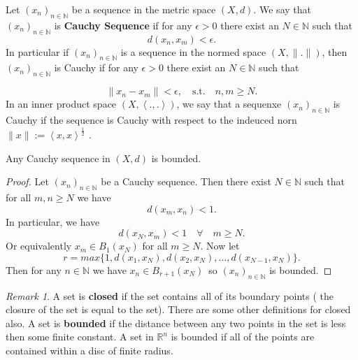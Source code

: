 \documentclass{article}
\theoremstyle{remark}
\newtheorem*{remark}{Remark}
\begin{document}
\begin{definition}
  
  Let $(x_n)_{n \in \mathbb{N}}$ be a sequence in the metric space $(X, d)$. We say that $\left( x_n \right)_{n \in \mathbb{N}} $ is \textbf{Cauchy Sequence} if for any $ \epsilon > 0$ there exist an $N \in \mathbb{N}$ such that \[  
    d(x_{n}, x_{m}) < \epsilon      
  .\]  
  In particular if $\left( x_n \right)_{n \in \mathbb{N}}$ is a sequence in the normed space $\left( X,\|.\| \right) $, then $\left( x_n \right) _{n \in\mathbb{N}}$ is Cauchy if for any $\epsilon > 0$ there exist an $N \in \mathbb{N}$ such that

  \[
  \|x_{n}  - x_{m}\| < \epsilon,\quad \textrm{s.t.} \quad  n,m \ge N
  .\] 
  In an inner product space $(X, \left< .,. \right> )$, we say that a sequenxe $\left( x_n \right)_{n \in \mathbb{N}}$ is Cauchy if the sequence is Cauchy with respect to the indeuced norn $\|x\| := \left< x,x \right>^{ \frac{1}{2} }$ . 
\end{definition}

\begin{lemma}
  Any Cauchy sequence in $\left( X,d \right)$ is bounded.
\end{lemma}

\begin{proof}
  Let $\left( x_n \right) _{n \in \mathbb{N}}$ be a Cauchy sequence. Then there exist $N \in \mathbb{N}$ such that for all $ m,n \ge N$ we have \[
    d(x_{m}, x_{n}) < 1
  .\] In particular, we have \[
  d(x_{N},x_{m})  < 1 \quad \forall \quad m \ge N      
  .\] 
  Or equivalently $x_{m} \in B_1(x_N)$ for all $m \ge N$. Now let \[
    r = max \{ 1, d(x_1, x_N), d(x_2, x_N), \ldots, d(x_{N-1}, x_N)\} 
  .\] 
  Then for any $n \in \mathbb{N}$ we have $x_n \in B_{r+1}\left( x_N \right) $\, so $\left( x_n \right) _{n \in \mathbb{N}}$
is bounded. 

\end{proof}

\begin{remark}
A set is  \textbf{closed} if the set contains all of its boundary points ( the closure of the set is equal to the set). There are some other definitions for closed also.  A set is \textbf{bounded} if the distance between any two points in the set is less then some finite constant. A set in $\mathbb{R}^{n}$ is bounded if all of the points are contained within a disc of finite radius.
\end{remark}
\end{document}

